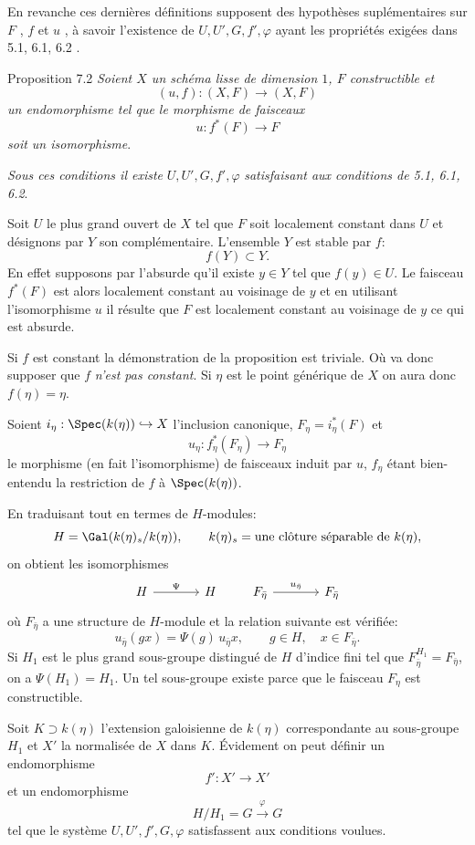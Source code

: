 En revanche ces dernières définitions supposent des hypothèses suplémentaires sur $F$ , $f$ et $u$ , à savoir l'existence de $U, U', G, f', \varphi$ ayant les propriétés exigées dans 5.1, 6.1, 6.2 .


\begin{statement}{Proposition 7.2}
\emph{Soient $X$ un schéma lisse de dimension $1$, $F$ constructible et}
\[
(u,f):(X,F)\longrightarrow (X,F)
\]
\emph{un endomorphisme tel que le morphisme de faisceaux}
\[
u:f^*(F)\longrightarrow F
\]
\emph{soit un isomorphisme}.

\emph{Sous ces conditions il existe} $U,U',G,f',\varphi$ \emph{satisfaisant aux conditions de 5.1, 6.1, 6.2}.
\end{statement}

\begin{prooftext}[Démonstration]
Soit $U$ le plus grand ouvert de $X$ tel que $F$ soit localement constant dans $U$ et désignons par $Y$ son complémentaire. L'ensemble $Y$ est stable par $f$:
\[
f(Y)\subset Y.
\]
En effet supposons par l'absurde qu'il existe $y\in Y$ tel que $f(y)\in U$. Le faisceau $f^*(F)$ est alors localement constant au voisinage de $y$ et en utilisant l'isomorphisme $u$ il résulte que $F$ est localement constant au voisinage de $y$ ce qui est absurde.

Si $f$ est constant la démonstration de la proposition est triviale. Où va donc supposer que $f$ \emph{n'est pas constant}. Si $\eta$ est le point générique de $X$ on aura donc $f(\eta)=\eta$.

Soient $i_\eta:\Spec(k(\eta))\hookrightarrow X$ l'inclusion canonique, $F_\eta=i_\eta^*(F)$ et
\[
u_\eta:f_\eta^*(F_\eta)\longrightarrow F_\eta
\]
le morphisme (en fait l'isomorphisme) de faisceaux induit par $u$, $f_\eta$ étant bien-entendu la restriction de $f$ à $\Spec(k(\eta))$.

En traduisant tout en termes de $H$-modules:
\[
H=\Gal(k(\eta)_s/k(\eta)),\qquad k(\eta)_s=\text{une clôture séparable de }k(\eta),
\]
on obtient les isomorphismes
\[
\begin{tikzcd}[column sep=large]
H \arrow[r,"\Psi"] & H
\end{tikzcd}
\qquad
\begin{tikzcd}[column sep=large]
F_{\bar\eta} \arrow[r,"u_{\bar\eta}"] & F_{\bar\eta}
\end{tikzcd}
\]
où $F_{\bar\eta}$ a une structure de $H$-module et la relation suivante est vérifiée:
\[
u_{\bar\eta}(gx)=\Psi(g)\,u_{\bar\eta} x,
\qquad g\in H,
\quad x\in F_{\bar\eta}.
\]
Si $H_1$ est le plus grand sous-groupe distingué de $H$ d'indice fini tel que $F_{\bar\eta}^{H_1}=F_{\bar\eta}$, on a $\Psi(H_1)=H_1$. Un tel sous-groupe existe parce que le faisceau $F_\eta$ est constructible.

Soit $K\supset k(\eta)$ l'extension galoisienne de $k(\eta)$ correspondante au sous-groupe $H_1$ et $X'$ la normalisée de $X$ dans $K$. Évidement on peut définir un endomorphisme
\[
f':X'\longrightarrow X'
\]
et un endomorphisme
\[
H/H_1=G\xrightarrow{\varphi}G
\]
tel que le système $U,U',f',G,\varphi$ satisfassent aux conditions voulues.
\end{prooftext}

